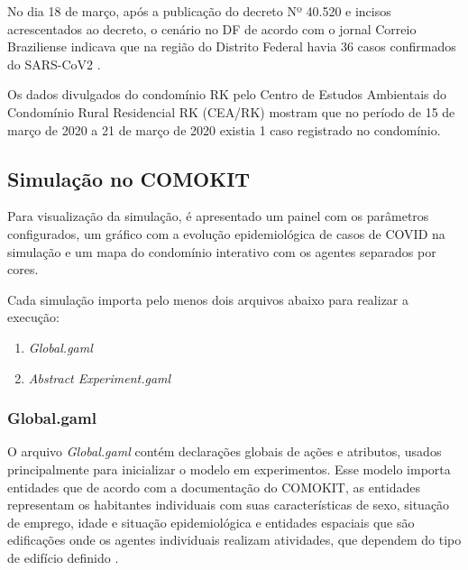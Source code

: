No dia 18 de março, após a publicação do decreto Nº 40.520 e incisos acrescentados ao decreto, o cenário no DF de acordo com o jornal Correio Braziliense indicava que na região do Distrito Federal havia 36 casos confirmados do SARS-CoV2 \cite{CorreioBraziliense032020:online}.

Os dados divulgados do condomínio RK pelo Centro de Estudos Ambientais do Condomínio Rural Residencial RK (CEA/RK) mostram que no período de 15 de março de 2020 a 21 de março de 2020 existia 1 caso registrado no condomínio.


\subsection{Simulação no COMOKIT}

Para visualização da simulação, é apresentado um painel com os parâmetros configurados, um gráfico com a evolução epidemiológica de casos de COVID na simulação e um mapa do condomínio interativo com os agentes separados por cores.


Cada simulação importa pelo menos dois arquivos abaixo para realizar a execução:
\begin{enumerate}
\item \textit{Global.gaml}
\item \textit{Abstract Experiment.gaml}
\end{enumerate}

\subsubsection{Global.gaml}

O arquivo \textit{Global.gaml} contém declarações globais de ações e atributos, usados principalmente para inicializar o modelo em experimentos. Esse modelo importa entidades que de acordo com a documentação do COMOKIT, as entidades representam os habitantes individuais com suas características de sexo, situação de emprego, idade e situação epidemiológica e entidades espaciais que são edificações onde os agentes individuais realizam atividades, que dependem do tipo de edifício definido \cite{ComokitDoc}.

